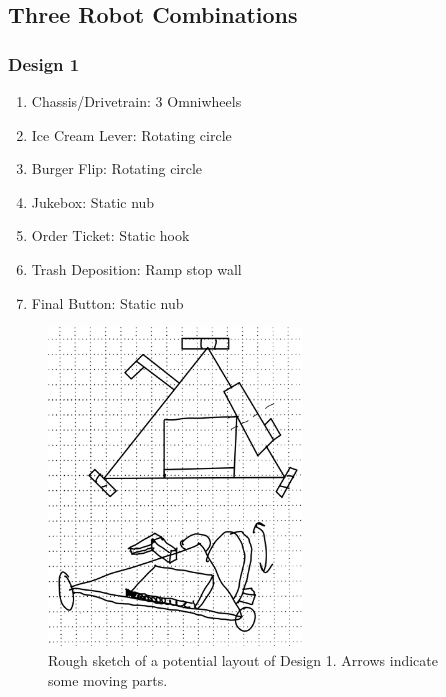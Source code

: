 \documentclass[12pt]{extarticle}
\begin{document}
\subsection*{Three Robot Combinations}
\subsubsection*{Design 1}
\begin{enumerate}
    \item Chassis/Drivetrain: 3 Omniwheels 
    \item Ice Cream Lever: Rotating circle
    \item Burger Flip: Rotating circle
    \item Jukebox: Static nub
    \item Order Ticket: Static hook
    \item Trash Deposition: Ramp stop wall
    \item Final Button: Static nub
\end{enumerate}
\begin{figure}[H]
    \centering
    \includegraphics[width=0.6\textwidth]{Omni.png}
    \caption{\centering Rough sketch of a potential layout of Design 1. Arrows indicate some moving parts.}
    \label{fig:omni}
\end{figure}
\end{document}
